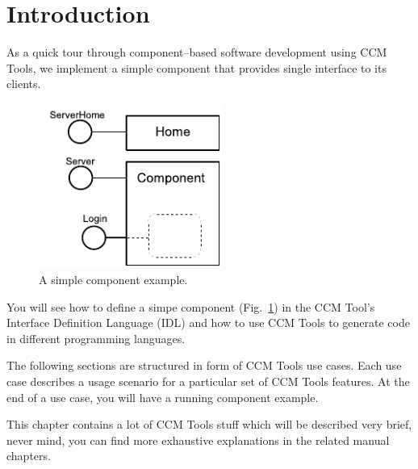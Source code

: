 \section{Introduction}
\label{section:Introduction}

As a quick tour through component--based software development using CCM Tools,
we implement a simple component that provides single interface to its clients.

\begin{figure}[htbp]
    \begin{center}
        \includegraphics [width=6cm,angle=0] {figures/LoginComponentExample}
        \caption{ A simple component example.}
        \label{figure:SimpleComponentExample}
    \end{center}
\end{figure}

You will see how to define a simpe component
(Fig.~\ref{figure:SimpleComponentExample}) in the CCM Tool's Interface
Definition Language (IDL) and how to use CCM Tools to generate code
in different programming languages.

\vspace{3mm}
The following sections are structured in form of CCM Tools use cases. Each use
case describes a usage scenario for a particular set of CCM Tools features. 
At the end of a use case, you will have a running component example.

\vspace{3mm}
This chapter contains a lot of CCM Tools stuff which will be described very
brief, never mind, you can find more exhaustive 	explanations in the related
manual chapters. 


\newpage


